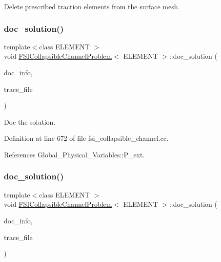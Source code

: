 Delete prescribed traction elements from the surface mesh. 

\mbox{\label{classFSICollapsibleChannelProblem_aff5cacbc8d81f6c1beda947085496462}} 
\subsubsection{\texorpdfstring{doc\+\_\+solution()}{doc\_solution()}\hspace{0.1cm}{\footnotesize\ttfamily [1/4]}}
{\footnotesize\ttfamily template$<$class E\+L\+E\+M\+E\+NT $>$ \\
void \hyperlink{classFSICollapsibleChannelProblem}{F\+S\+I\+Collapsible\+Channel\+Problem}$<$ E\+L\+E\+M\+E\+NT $>$\+::doc\+\_\+solution (\begin{DoxyParamCaption}\item[{Doc\+Info \&}]{doc\+\_\+info,  }\item[{ofstream \&}]{trace\+\_\+file }\end{DoxyParamCaption})}



Doc the solution. 



Definition at line 672 of file fsi\+\_\+collapsible\+\_\+channel.\+cc.



References Global\+\_\+\+Physical\+\_\+\+Variables\+::\+P\+\_\+ext.

\mbox{\label{classFSICollapsibleChannelProblem_aff5cacbc8d81f6c1beda947085496462}} 
\subsubsection{\texorpdfstring{doc\+\_\+solution()}{doc\_solution()}\hspace{0.1cm}{\footnotesize\ttfamily [2/4]}}
{\footnotesize\ttfamily template$<$class E\+L\+E\+M\+E\+NT $>$ \\
void \hyperlink{classFSICollapsibleChannelProblem}{F\+S\+I\+Collapsible\+Channel\+Problem}$<$ E\+L\+E\+M\+E\+NT $>$\+::doc\+\_\+solution (\begin{DoxyParamCaption}\item[{Doc\+Info \&}]{doc\+\_\+info,  }\item[{ofstream \&}]{trace\+\_\+file }\end{DoxyParamCaption})}



